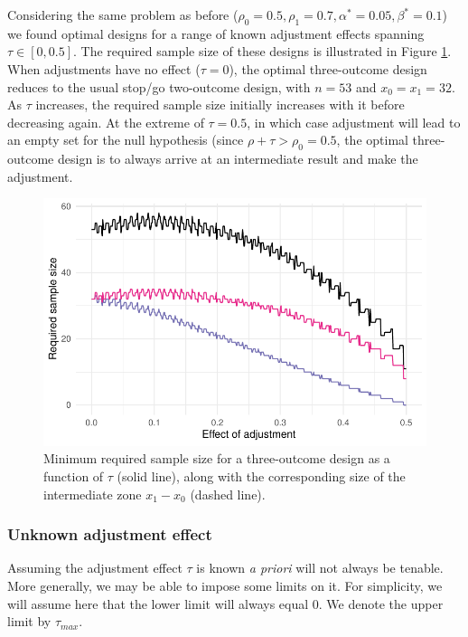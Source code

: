 \documentclass[Crown, times, sagev]{sagej}
\begin{document}
Considering the same problem as before ($\rho_0 = 0.5, \rho_1 = 0.7, \alpha^* = 0.05, \beta^* = 0.1$) we found optimal designs for a range of known adjustment effects spanning $\tau \in [0, 0.5]$. The required sample size of these designs is illustrated in Figure \ref{fig:tau_ns}. When adjustments have no effect ($\tau = 0$), the optimal three-outcome design reduces to the usual stop/go two-outcome design, with $n = 53$ and $x_0 = x_1 = 32$. As $\tau$ increases, the required sample size initially increases with it before decreasing again. At the extreme of $\tau = 0.5$, in which case adjustment will lead to an empty set for the null hypothesis (since $\rho + \tau > \rho_0 = 0.5$, the optimal three-outcome design is to always arrive at an intermediate result and make the adjustment.

\begin{figure}
\centering
\includegraphics[scale=0.8]{./figures/tau_ns}
\caption{Minimum required sample size for a three-outcome design as a function of $\tau$ (solid line), along with the corresponding size of the intermediate zone $x_1 - x_0$ (dashed line).}
\label{fig:tau_ns}
\end{figure}

\subsubsection{Unknown adjustment effect}

Assuming the adjustment effect $\tau$ is known \emph{a priori} will not always be tenable. More generally, we may be able to impose some limits on it. For simplicity, we will assume here that the lower limit will always equal 0. We denote the upper limit by $\tau_{max}$.
\end{document}
